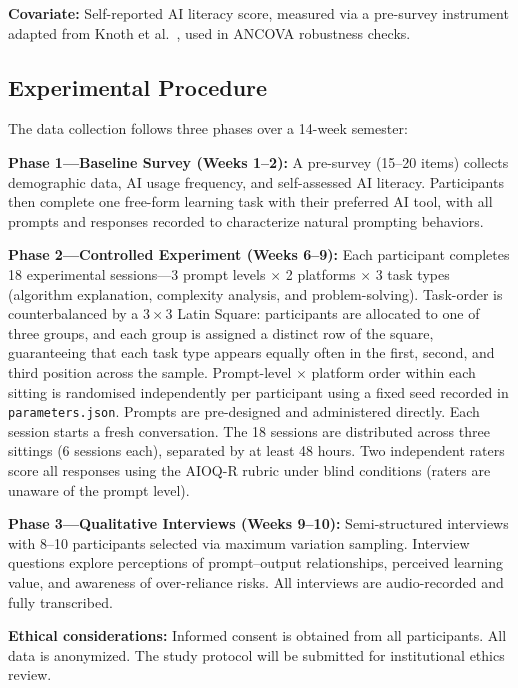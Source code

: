 \documentclass[runningheads]{llncs}
\begin{document}
\textbf{Covariate:} Self-reported AI literacy score, measured via a pre-survey instrument adapted from Knoth et al.~\cite{Knoth2024}, used in ANCOVA robustness checks.

\subsection{Experimental Procedure}

The data collection follows three phases over a 14-week semester:

\textbf{Phase 1---Baseline Survey (Weeks 1--2):} A pre-survey (15--20 items) collects demographic data, AI usage frequency, and self-assessed AI literacy. Participants then complete one free-form learning task with their preferred AI tool, with all prompts and responses recorded to characterize natural prompting behaviors.

\textbf{Phase 2---Controlled Experiment (Weeks 6--9):} Each participant completes 18 experimental sessions---3 prompt levels $\times$ 2 platforms $\times$ 3 task types (algorithm explanation, complexity analysis, and problem-solving). Task-order is counterbalanced by a $3 \times 3$ Latin Square: participants are allocated to one of three groups, and each group is assigned a distinct row of the square, guaranteeing that each task type appears equally often in the first, second, and third position across the sample. Prompt-level $\times$ platform order within each sitting is randomised independently per participant using a fixed seed recorded in \texttt{parameters.json}. Prompts are pre-designed and administered directly. Each session starts a fresh conversation. The 18 sessions are distributed across three sittings (6 sessions each), separated by at least 48 hours. Two independent raters score all responses using the AIOQ-R rubric under blind conditions (raters are unaware of the prompt level).

\textbf{Phase 3---Qualitative Interviews (Weeks 9--10):} Semi-structured interviews with 8--10 participants selected via maximum variation sampling. Interview questions explore perceptions of prompt--output relationships, perceived learning value, and awareness of over-reliance risks. All interviews are audio-recorded and fully transcribed.

\textbf{Ethical considerations:} Informed consent is obtained from all participants. All data is anonymized. The study protocol will be submitted for institutional ethics review.
\end{document}
